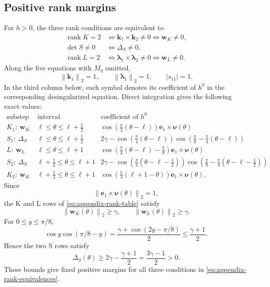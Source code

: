 \documentclass[]{article}
\numberwithin{equation}{section}
\theoremstyle{plain}
\theoremstyle{remark}
\newcommand{\norm}[1]{\left\lVert #1\right\rVert}
\begin{document}
\subsection{Positive rank margins}
\label{app:positive-rank-margins}

For $h>0$, the three rank conditions are equivalent to
\begin{equation}\label{eq:appendix-rank-equivalences}
\begin{aligned}
 \operatorname{rank}K=2
 &\iff \boldsymbol k_1\times\boldsymbol k_2\ne0
 \iff \boldsymbol w_K\ne0,\\
 \det S\ne0&\iff \Delta_S\ne0,\\
 \operatorname{rank}L=2
 &\iff \boldsymbol\lambda_1\times\boldsymbol\lambda_2\ne0
 \iff \boldsymbol w_L\ne0.
\end{aligned}
\end{equation}
Along the five equations with $M_\eta$ omitted,
\[
 \norm{\boldsymbol k_1}_2=1,
 \qquad \norm{\boldsymbol\lambda_1}_2=1,
 \qquad |s_{11}|=1.
\]
In the third column below, each symbol denotes its coefficient of
$h^0$ in the corresponding desingularized equation.  Direct
integration gives the following exact values:
{\small
\setlength{\arraycolsep}{3pt}
\begin{equation}\label{eq:appendix-rank-table}
\begin{array}{c|c|c}
\text{substep and quantity}&\text{interval}&\text{coefficient of $h^0$}\\
\hline
K_1:\ \boldsymbol w_K&\ell\le\theta\le\ell+\tfrac12&
 \cos\!\left(\frac\pi4(\theta-\ell)\right)
  \boldsymbol e_1\times\boldsymbol\nu(\theta)\\[2mm]
S_1:\ \Delta_S&\ell\le\theta\le\ell+\tfrac12&
 2\gamma-\cos\!\left(\frac\pi4(\theta-\ell)\right)
 \cos\!\left(\frac\pi8-\frac\pi4(\theta-\ell)\right)\\[2mm]
L:\ \boldsymbol w_L&\ell\le\theta\le\ell+1&
 \cos\!\left(\frac\pi4(\theta-\ell)-\frac\pi8\right)
  \boldsymbol e_1\times\boldsymbol\nu(\theta)\\[2mm]
S_2:\ \Delta_S&\ell+\tfrac12\le\theta\le\ell+1&
 2\gamma-\cos\!\left(\frac\pi4(\theta-\ell-\tfrac12)\right)
 \cos\!\left(\frac\pi8-\frac\pi4(\theta-\ell-\tfrac12)\right)\\[2mm]
K_2:\ \boldsymbol w_K&\ell+\tfrac12\le\theta\le\ell+1&
 \cos\!\left(\frac\pi4(\ell+1-\theta)\right)
  \boldsymbol e_1\times\boldsymbol\nu(\theta).
\end{array}
\end{equation}
}
Since
\[
 \norm{\boldsymbol e_1\times\boldsymbol\nu(\theta)}_2=1,
\]
the K and L rows of \eqref{eq:appendix-rank-table} satisfy
\[
 \norm{\boldsymbol w_K(\theta)}_2
 \ge\gamma,
 \qquad
 \norm{\boldsymbol w_L(\theta)}_2
 \ge\gamma.
\]
For $0\le y\le\pi/8$,
\[
 \cos y\cos(\pi/8-y)
 =\frac{\gamma+\cos(2y-\pi/8)}2
 \le\frac{\gamma+1}{2}.
\]
Hence the two S rows satisfy
\[
 \Delta_S(\theta)
 \ge 2\gamma-\frac{\gamma+1}{2}
 =\frac{3\gamma-1}{2}>0.
\]
These bounds give fixed positive margins for all three conditions in
\eqref{eq:appendix-rank-equivalences}.
\end{document}
